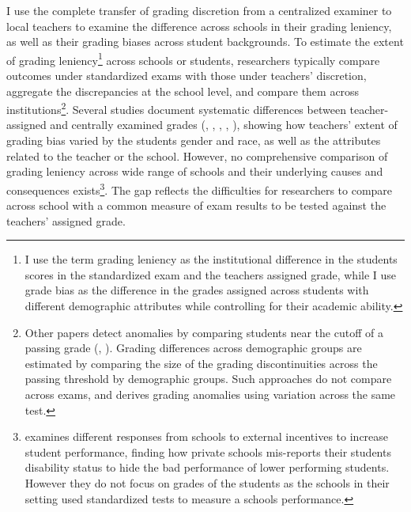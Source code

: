 I use the complete transfer of grading discretion from a centralized examiner to local teachers to examine the difference across schools in their grading leniency, as well as their grading biases across student backgrounds. To estimate the extent of grading leniency\footnote{I use the term grading leniency as the institutional difference in the students scores in the standardized exam and the teachers assigned grade, while I use grade bias as the difference in the grades assigned across students with different demographic attributes while controlling for their academic ability.} across schools or students, researchers typically compare outcomes under standardized exams with those under teachers’ discretion, aggregate the discrepancies at the school level, and compare them across institutions\footnote{Other papers detect anomalies by comparing students near the cutoff of a passing grade (\cite{neal2008}, \cite{diamond}). Grading differences across demographic groups are estimated by comparing the size of the grading discontinuities across the passing threshold by demographic groups. Such approaches do not compare across exams, and derives grading anomalies using variation across the same test.}. Several studies document systematic differences between teacher-assigned and centrally examined grades (\cite{10.1162/00335530360698441}, \cite{lavy2009}, \cite{hanna2012}, \cite{dee2019}, \cite{Alesina2024}), showing how teachers' extent of grading bias varied by the students gender and race, as well as the attributes related to the teacher or the school. However, no comprehensive comparison of grading leniency across wide range of schools and their underlying causes and consequences exists\footnote{\cite{figlio2006} examines different responses from schools to external incentives to increase student performance, finding how private schools mis-reports their students disability status to hide the bad performance of lower performing students. However they do not focus on grades of the students as the schools in their setting used standardized tests to measure a schools performance.}. The gap reflects the difficulties for researchers to compare across school with a common measure of exam results to be tested against the teachers' assigned grade.

